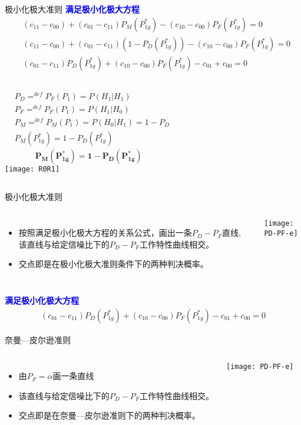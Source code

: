 \begin{frame}[shrink]{极小化极大准则}
\textbf{\textcolor{blue}{满足极小化极大方程}}
\begin{align*}
&(c_{11}-c_{00})+(c_{01}-c_{11})P_M(P_{1g}^\ast)-(c_{10}-c_{00})P_F(P_{1g}^\ast)=0\\
&(c_{11}-c_{00})+(c_{01}-c_{11})\left(1-P_D(P_{1g}^\ast)\right)-(c_{10}-c_{00})P_F(P_{1g}^\ast)=0\\
&(c_{01}-c_{11})P_D(P_{1g}^\ast)+(c_{10}-c_{00})P_F(P_{1g}^\ast)-c_{01}+c_{00}=0
\end{align*}
\begin{columns}[T]
	\begin{align*}
	&P_D \mathop{=}^{def}P_F(P_1)=P(H_1|H_1)\\
	&P_F \mathop{=}^{def}P_F(P_1)=P(H_1|H_0)\\
	&P_M \mathop{=}^{def}P_M(P_1)=P(H_0|H_1)=1-P_D\\
	&P_M(P_{1g}^\ast)=1-P_D(P_{1g}^\ast)
	\end{align*}
	\[\bm{P_M(P_{1g}^\ast)=1-P_D(P_{1g}^\ast)} \]
	\texttt{[image: R0R1]}
\end{columns}
\end{frame}

\begin{frame}[shrink]{极小化极大准则}
\begin{columns}[T]
	\begin{itemize}
		\item 按照满足极小化极大方程的关系公式，画出一条$P_D-P_F$直线, 该直线与给定信噪比下的$P_D-P_F$工作特性曲线相交。
		\item 交点即是在极小化极大准则条件下的两种判决概率。
	\end{itemize}
	\texttt{[image: PD-PF-e]}
\end{columns}
\textbf{\textcolor{blue}{满足极小化极大方程}}
\begin{align*}
(c_{01}-c_{11})P_D(P_{1g}^\ast)+(c_{10}-c_{00})P_F(P_{1g}^\ast)-c_{01}+c_{00}=0
\end{align*}
\end{frame}

\begin{frame}[shrink]{奈曼---皮尔逊准则}
\begin{columns}[T]
	\begin{itemize}
		\item 由$P_F=\alpha$画一条直线
		\item 该直线与给定信噪比下的$P_D-P_F$工作特性曲线相交。
		\item 交点即是在奈曼---皮尔逊准则下的两种判决概率。
	\end{itemize}
	\texttt{[image: PD-PF-e]}
\end{columns}
\end{frame}

